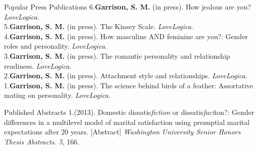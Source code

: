 \documentclass {resume}
\newcommand{\meb}{{\bf Garrison, S. M.}\xspace}
\begin{document}
\pagestyle{myheadings}
\begin{samepage}\begin{rSection}{\textrm{Popular Press Publications}}
6.\hspace* {2.5 mm}\textbf{Garrison, S. M.} (in press). How jealous are you? \textit{LoveLogica}.\smallskip\\
5.\hspace* {2.5 mm}\textbf{Garrison, S. M.} (in press). The Kinsey Scale. \textit{LoveLogica}.\smallskip\\
4.\hspace* {2.5 mm}\textbf{Garrison, S. M.} (in press). How masculine AND feminine are you?: Gender roles and personality. \textit{LoveLogica}.\smallskip\\
3.\hspace* {2.5 mm}\textbf{Garrison, S. M.} (in press). %
The romantic personality and relationship readiness. \textit{LoveLogica}.\smallskip\\
2.\hspace* {2.5 mm}\textbf{Garrison, S. M.} (in press). Attachment style and relationships. \textit{LoveLogica}.\smallskip\\
1.\hspace* {2.5 mm}\textbf{Garrison, S. M.} (in press). The science behind birds of a feather: Assortative mating on personality. \textit{LoveLogica}.
\end{rSection}\end{samepage}
\pagebreak
\begin{samepage}\begin{rSection}{\textrm{Published Abstracts}}
1.\hspace* {2.5 mm}\meb (2013). Domestic dissatis{\em fiction} or dissatis{\em fact}ion?: Gender differences in a multilevel model \hspace* {6 mm}of marital satisfaction using prenuptial marital expectations after 20 years. [Abstract] {\em Washington University \hspace* {6 mm}Senior Honors Thesis Abstracts. 5}, 166.\end{rSection}\end{samepage}%

\end{document}
